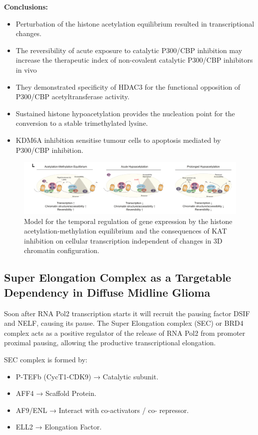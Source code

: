 \textbf{Conclusions:}
\begin{itemize}
\tightlist
\item Perturbation of the histone acetylation equilibrium resulted in transcriptional changes.
\item The reversibility of acute exposure to catalytic P300/CBP inhibition may increase the therapeutic index of non-covalent catalytic P300/CBP inhibitors in vivo
\item They demonstrated specificity of HDAC3 for the functional opposition of P300/CBP acetyltransferase activity.
\item Sustained histone hypoacetylation provides the nucleation point for the conversion to a stable trimethylated lysine.
\item KDM6A inhibition sensitise tumour cells to apoptosis mediated by P300/CBP inhibition.
\end{itemize}

\begin{figure}
\centering
\includegraphics[width=\textwidth]{../_resources/Screen_Shot_2022-12-20_at_12-01-08.png}
\caption{Model for the temporal regulation of gene expression by the histone acetylation-methylation equilibrium and the consequences of KAT inhibition on cellular transcription independent of changes in 3D chromatin configuration.}
\end{figure}

\subsection{Super Elongation Complex as a Targetable Dependency in Diffuse Midline Glioma}
Soon after RNA Pol2 transcription starts it will recruit the
pausing factor DSIF and NELF, causing its pause.
The Super Elongation complex (SEC) or BRD4 complex acts as
a positive regulator of the release of RNA Pol2 from
promoter proximal pausing, allowing the productive
transcriptional elongation.

SEC complex is formed by:
\begin{itemize}
\tightlist
\item P-TEFb (CycT1-CDK9) → Catalytic subunit.
\item AFF4 → Scaffold Protein.
\item AF9/ENL → Interact with co-activators / co-
repressor.
\item ELL2 → Elongation Factor.
\end{itemize}

